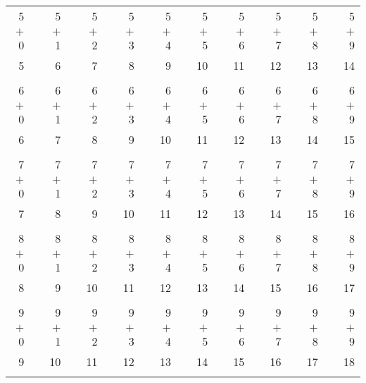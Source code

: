 \documentclass[12pt, letterpaper]{article}
\begin{document}
\begin{tabular}{rrrrrrrrrrrrrrrrrrr}
5 & & 5 & & 5 & & 5 & & 5 & & 5 & & 5 & & 5 & & 5 & & 5\\
$+$ 0 & & $+$ 1 & & $+$ 2 & & $+$ 3 & & $+$ 4 & & $+$ 5 & & $+$ 6 & & $+$ 7 & & $+$ 8 & & $+$ 9\\
\cline{1-1} \cline{3-3} \cline{5-5} \cline{7-7} \cline{9-9} \cline{11-11} \cline{13-13} \cline{15-15} \cline{17-17} \cline{19-19} 5 & & 6 & & 7 & & 8 & & 9 & & 10 & & 11 & & 12 & & 13 & & 14\\ \\
6 & & 6 & & 6 & & 6 & & 6 & & 6 & & 6 & & 6 & & 6 & & 6\\
$+$ 0 & & $+$ 1 & & $+$ 2 & & $+$ 3 & & $+$ 4 & & $+$ 5 & & $+$ 6 & & $+$ 7 & & $+$ 8 & & $+$ 9\\
\cline{1-1} \cline{3-3} \cline{5-5} \cline{7-7} \cline{9-9} \cline{11-11} \cline{13-13} \cline{15-15} \cline{17-17} \cline{19-19} 6 & & 7 & & 8 & & 9 & & 10 & & 11 & & 12 & & 13 & & 14 & & 15\\ \\
7 & & 7 & & 7 & & 7 & & 7 & & 7 & & 7 & & 7 & & 7 & & 7\\
$+$ 0 & & $+$ 1 & & $+$ 2 & & $+$ 3 & & $+$ 4 & & $+$ 5 & & $+$ 6 & & $+$ 7 & & $+$ 8 & & $+$ 9\\
\cline{1-1} \cline{3-3} \cline{5-5} \cline{7-7} \cline{9-9} \cline{11-11} \cline{13-13} \cline{15-15} \cline{17-17} \cline{19-19} 7 & & 8 & & 9 & & 10 & & 11 & & 12 & & 13 & & 14 & & 15 & & 16\\ \\
8 & & 8 & & 8 & & 8 & & 8 & & 8 & & 8 & & 8 & & 8 & & 8\\
$+$ 0 & & $+$ 1 & & $+$ 2 & & $+$ 3 & & $+$ 4 & & $+$ 5 & & $+$ 6 & & $+$ 7 & & $+$ 8 & & $+$ 9\\
\cline{1-1} \cline{3-3} \cline{5-5} \cline{7-7} \cline{9-9} \cline{11-11} \cline{13-13} \cline{15-15} \cline{17-17} \cline{19-19} 8 & & 9 & & 10 & & 11 & & 12 & & 13 & & 14 & & 15 & & 16 & & 17\\ \\
9 & & 9 & & 9 & & 9 & & 9 & & 9 & & 9 & & 9 & & 9 & & 9\\
$+$ 0 & & $+$ 1 & & $+$ 2 & & $+$ 3 & & $+$ 4 & & $+$ 5 & & $+$ 6 & & $+$ 7 & & $+$ 8 & & $+$ 9\\
\cline{1-1} \cline{3-3} \cline{5-5} \cline{7-7} \cline{9-9} \cline{11-11} \cline{13-13} \cline{15-15} \cline{17-17} \cline{19-19} 9 & & 10 & & 11 & & 12 & & 13 & & 14 & & 15 & & 16 & & 17 & & 18\\ \\
\end{tabular}
\end{document}
